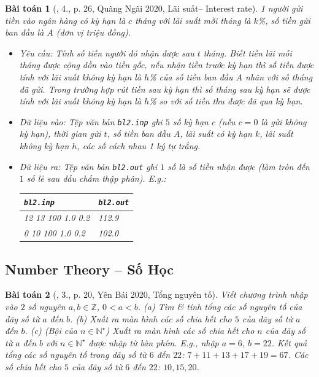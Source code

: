\documentclass{article}
\newtheorem{baitoan}{Bài toán}
\begin{document}
\begin{baitoan}[\cite{VietSTEM2021}, 4., p. 26, Quãng Ngãi 2020, Lãi suất-- Interest rate]
	1 người gửi tiền vào ngân hàng có kỳ hạn là $c$ tháng với lãi suất mỗi tháng là $k$\emph{\%}, số tiền gửi ban đầu là $A$ (đơn vị triệu đồng). 
	\begin{itemize}
		\item {\sf Yêu cầu:} Tính số tiền người đó nhận được sau $t$ tháng. Biết tiền lãi mỗi tháng được cộng dồn vào tiền gốc, nếu nhận tiền trước kỳ hạn thì số tiền được tính với lãi suất không kỳ hạn là $h$\emph{\%} của số tiền ban đầu $A$ nhân với số tháng đã gửi. Trong trường hợp rút tiền sau kỳ hạn thì số tháng sau kỳ hạn sẽ được tính với lãi suất không kỳ hạn là $h$\emph{\%} so với số tiền thu được đã qua kỳ hạn.
		\item {\sf Dữ liệu vào:} Tệp văn bản \verb|bl2.inp| ghi $5$ số kỳ hạn $c$ (nếu $c = 0$ là gửi không kỳ hạn), thời gian gửi $t$, số tiền ban đầu $A$, lãi suất có kỳ hạn $k$, lãi suất không kỳ hạn $h$, các số cách nhau 1 ký tự trắng.
		\item {\sf Dữ liệu ra:} Tệp văn bản \verb|bl2.out| ghi $1$ số là số tiền nhận được (làm tròn đến $1$ số lẻ sau dấu chấm thập phân). E.g.:
		\begin{table}[H]
			\centering
			\begin{tabular}{|l|l|}
				\hline
				{\tt bl2.inp} & {\tt bl2.out} \\
				\hline
				12 13 100 1.0 0.2 & 112.9 \\
				\hline
				0 10 100 1.0 0.2 & 102.0 \\
				\hline
			\end{tabular}
		\end{table}
	\end{itemize}
\end{baitoan}


\subsection{Number Theory -- Số Học}

\begin{baitoan}[\cite{VietSTEM2021}, 3., p. 20, Yên Bái 2020, Tổng nguyên tố]
	Viết chương trình nhập vào $2$ số nguyên $a,b\in\mathbb{Z}$, $0 < a < b$. (a) Tìm \& tính tổng các số nguyên tố của dãy số từ $a$ đến $b$. (b) Xuất ra màn hình các số chia hết cho $5$ của dãy số từ $a$ đến $b$. (c) \emph{(Bội của $n\in\mathbb{N}^\star$)} Xuất ra màn hình các số chia hết cho $n$ của dãy số từ $a$ đến $b$ với $n\in\mathbb{N}^\star$ được nhập từ bàn phím. E.g., nhập $a = 6$, $b = 22$. Kết quả tổng các số nguyên tố trong dãy số từ $6$ đến $22$: $7 + 11 + 13 + 17 + 19 = 67$. Các số chia hết cho $5$ của dãy số từ $6$ đến $22$: $10,15,20$.
\end{baitoan}
\end{document}
